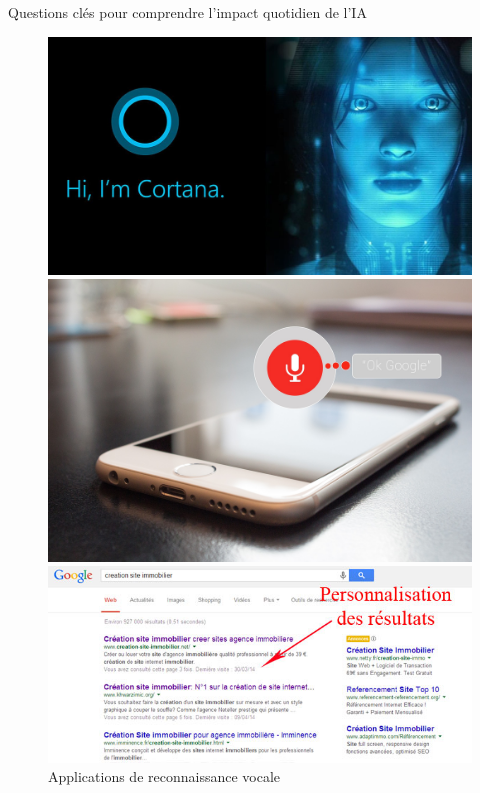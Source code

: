\documentclass{beamer}
\begin{document}
		
	\begin{frame}{Questions clés pour comprendre l'impact quotidien de l'IA}
		
		\begin{figure}[h]
			\centering
			\begin{minipage}{0.4\textwidth}
				\centering
				\includegraphics[width=\linewidth]{cortana_.jpg}
				\caption{Assistant personnel intelligent de MS}
			\end{minipage}\hfill
			\begin{minipage}{0.34\textwidth}
				\centering
				\includegraphics[width=\linewidth]{voice-control.jpg}
				\caption{Applications de reconnaissance vocale}
			\end{minipage}
			\vspace{0.5cm}
			\begin{minipage}{0.4\textwidth}
				\centering
				\includegraphics[width=\linewidth]{personnalisation.jpg}

\end{minipage}
\end{figure}
\end{frame}
\end{document}
